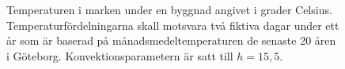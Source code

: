 \begin{figure}
\centering
{}

\caption{\label{fig:groundheat}Temperaturen i marken under en byggnad angivet i grader Celsius.
Temperaturfördelningarna skall motsvara två fiktiva dagar under ett år som är baserad på månadsmedeltemperaturen
de senaste 20 åren i Göteborg. Konvektionsparametern är satt till $h=15,5$. }
\end{figure}


